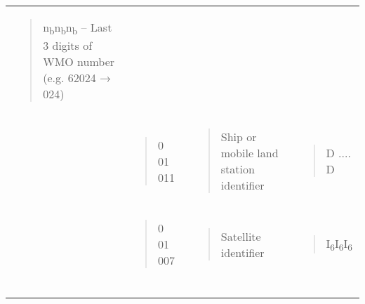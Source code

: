 \begin{longtable}[]{@{}llll@{}}
\begin{minipage}[t]{0.22\columnwidth}
\begin{quote}
n\textsubscript{b}n\textsubscript{b}n\textsubscript{b} -- Last 3 digits of WMO number (e.g. 62024 → 024)
\end{quote}\strut
\end{minipage}\tabularnewline
\begin{minipage}[t]{0.22\columnwidth}\raggedright
\strut
\end{minipage} & \begin{minipage}[t]{0.22\columnwidth}\raggedright
\begin{quote}
0 01 011
\end{quote}\strut
\end{minipage} & \begin{minipage}[t]{0.22\columnwidth}\raggedright
\begin{quote}
Ship or mobile land station identifier
\end{quote}\strut
\end{minipage} & \begin{minipage}[t]{0.22\columnwidth}\raggedright
\begin{quote}
D .... D
\end{quote}\strut
\end{minipage}\tabularnewline
\begin{minipage}[t]{0.22\columnwidth}\raggedright
\strut
\end{minipage} & \begin{minipage}[t]{0.22\columnwidth}\raggedright
\begin{quote}
0 01 007
\end{quote}\strut
\end{minipage} & \begin{minipage}[t]{0.22\columnwidth}\raggedright
\begin{quote}
Satellite identifier
\end{quote}\strut
\end{minipage} & \begin{minipage}[t]{0.22\columnwidth}\raggedright
\begin{quote}
I\textsubscript{6}I\textsubscript{6}I\textsubscript{6}
\end{quote}\strut
\end{minipage}\tabularnewline
\begin{minipage}[t]{0.22\columnwidth}\raggedright
\strut
\end{minipage} & \begin{minipage}[t]{0.22\columnwidth}\raggedright
\begin{quote}

\end{quote}
\end{minipage}
\end{longtable}
